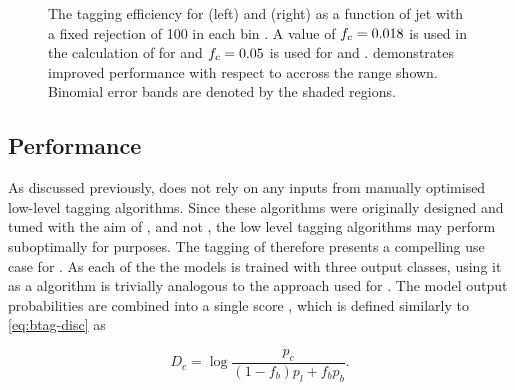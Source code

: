 \begin{figure}[!htbp]
\begin{subfigure}[b]{0.48\textwidth}
    \end{subfigure}
    \caption{The \bjet tagging efficiency for \ttbarjets (left) and \Zprimejets (right) as a function of jet \pt with a fixed \ljet rejection of 100 in each bin \cite{ATL-PHYS-PUB-2022-027}.
             A value of $f_c = 0.018$ is used in the calculation of \Db for \DLr and $f_c = 0.05$ is used for \GNN and \GNNLep.
             \GNN demonstrates improved performance with respect to \DLr accross the \pt range shown.
             Binomial error bands are denoted by the shaded regions.
             }
    \label{fig:vs_pt_flat_leff}
\end{figure}




\subsection{\texorpdfstring{\ctagging}{c-tagging} Performance}\label{sec:gnn_ctag_perf}

As discussed previously, \GNN does not rely on any inputs from manually optimised low-level tagging algorithms.
Since these algorithms were originally designed and tuned with the aim of \btag, and not \ctag, the low level tagging algorithms may perform suboptimally for \ctag purposes.
The tagging of \cjets therefore presents a compelling use case for \GNN.
As each of the the models is trained with three output classes, using it as a \ctagging algorithm is trivially analogous to the approach used for \btag.
The model output probabilities are combined into a single score \Dc, which is defined similarly to \cref{eq:btag-disc} as

\begin{equation}\label{eq:ctag-disc}
    D_c = \log{\frac{p_c}{(1-f_b)p_l + f_b p_b}} .
\end{equation}

